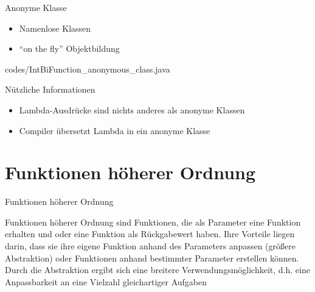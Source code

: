 \documentclass{../tuda-beamer}
\begin{document}
  \begin{frame}{Anonyme Klasse}
    \begin{itemize}
      \item Namenlose Klassen
      \item \enquote{on the fly} Objektbildung
    \end{itemize}

    
    {codes/IntBiFunction_anonymous_class.java}
  \end{frame}

  \begin{frame}{Nützliche Informationen}
    \begin{itemize}
      \item Lambda-Ausdrücke sind nichts anderes als anonyme Klassen
      \item Compiler übersetzt Lambda in ein anonyme Klasse
    \end{itemize}

    
  \end{frame}


  \section{Funktionen höherer Ordnung}
  \begin{frame}[c]{Funktionen höherer Ordnung}
    \begin{note}[title=Information:]
      Funktionen höherer Ordnung sind Funktionen, die als Parameter eine Funktion erhalten und oder
      eine Funktion als Rückgabewert haben. Ihre Vorteile liegen darin, dass sie ihre eigene Funktion
      anhand des Parameters anpassen (größere Abstraktion) oder Funktionen anhand bestimmter
      Parameter erstellen können. Durch die Abstraktion ergibt sich eine breitere
      Verwendungsmöglichkeit, d.h. eine Anpassbarkeit an eine Vielzahl gleichartiger Aufgaben
    \end{note}
  \end{frame}
\end{document}
